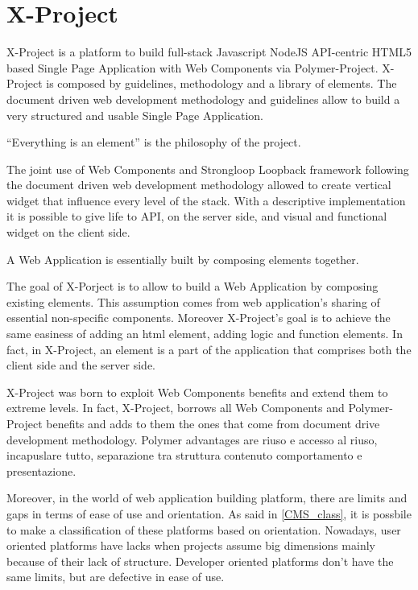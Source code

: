 \section{X-Project}
\label{sec:XPR_xpr}

X-Project is a platform to build full-stack Javascript NodeJS API-centric HTML5 based Single Page Application with Web Components via Polymer-Project.
X-Project is composed by guidelines, methodology and a library of elements.
The document driven web development methodology and guidelines allow to build a very structured and usable Single Page Application.

``Everything is an element'' is the philosophy of the project.

The joint use of Web Components and Strongloop Loopback framework following the document driven web development methodology allowed to create vertical widget that influence every level of the stack. With a descriptive implementation it is possible to give life to API, on the server side, and visual and functional widget on the client side.

A Web Application is essentially built by composing elements together.

The goal of X-Porject is to allow to build a Web Application by composing existing elements. This assumption comes from web application's sharing of essential non-specific components.
Moreover X-Project's goal is to achieve the same easiness of adding an html element, adding logic and function elements.
In fact, in X-Project, an element is a part of the application that comprises both the client side and the server side.

X-Project was born to exploit Web Components benefits and extend them to extreme levels. In fact, X-Project, borrows all Web Components and Polymer-Project benefits and adds to them the ones that come from document drive development methodology.
Polymer advantages are riuso e accesso al riuso, incapuslare tutto, separazione tra struttura contenuto comportamento e presentazione.

Moreover, in the world of web application building platform, there are limits and gaps in terms of ease of use and orientation. As said in \ref{CMS_class}, it is possbile to make a classification of these platforms based on orientation. Nowadays, user oriented platforms have lacks when projects assume big dimensions mainly because of their lack of structure. Developer oriented platforms don't have the same limits, but are defective in ease of use. 

